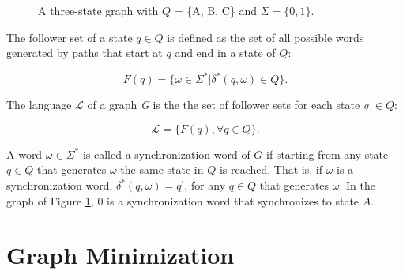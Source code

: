 {\begin{figure}
\centering
{}
\caption{A three-state graph with $Q$ = \{A, B, C\} and $\Sigma = \{0, 1\}$.\label{fig:graph}}
\end{figure}


\begin{definition}\label{def:followerset}
The follower set of a state $q \in Q$ is defined as the set of all possible words generated by paths that start at $q$ and end in a state of $Q$:
\end{definition}

\[ F(q) = \{\omega \in \Sigma^* | \delta^*(q, \omega) \in Q\}. \]


\begin{definition}\label{def:language}
The language $\mathcal{L}$ of a graph \textit{G} is the the set of follower sets for each state \textit{q} $\in Q$:
\end{definition}

\[ \mathcal{L} = \{F(\textit{q}), \forall \textit{q} \in Q\}. \]

\noindent A word $\omega \in \Sigma^*$ is called a synchronization word of $G$ if starting from any state $q \in Q$ that generates $\omega$ the same state in $Q$ is reached. That is, if $\omega$ is a synchronization word, $\delta^*(q, \omega) = q^{\prime}$, for any $q\in Q$ that generates $\omega$. In the graph of Figure \ref{fig:graph}, $0$ is a synchronization word that synchronizes to state $A$.

\section{Graph Minimization}

}
